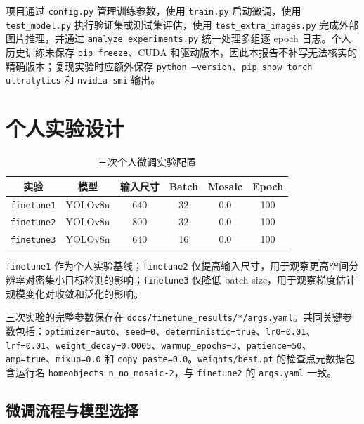 \documentclass[12pt,a4paper]{ctexart}
\begin{document}
项目通过 \texttt{config.py} 管理训练参数，使用 \texttt{train.py} 启动微调，使用 \texttt{test\_model.py} 执行验证集或测试集评估，使用 \texttt{test\_extra\_images.py} 完成外部图片推理，并通过 \texttt{analyze\_experiments.py} 统一处理多组逐 epoch 日志。个人历史训练未保存 \texttt{pip freeze}、CUDA 和驱动版本，因此本报告不补写无法核实的精确版本；复现实验时应额外保存 \texttt{python --version}、\texttt{pip show torch ultralytics} 和 \texttt{nvidia-smi} 输出。


\section{个人实验设计}

\begin{table}[H]
\centering
\caption{三次个人微调实验配置}
\begin{tabular}{cccccc}
\toprule
\textbf{实验} & \textbf{模型} & \textbf{输入尺寸} & \textbf{Batch} & \textbf{Mosaic} & \textbf{Epoch} \\
\midrule
\texttt{finetune1} & YOLOv8n & 640 & 32 & 0.0 & 100 \\
\texttt{finetune2} & YOLOv8n & 800 & 32 & 0.0 & 100 \\
\texttt{finetune3} & YOLOv8n & 640 & 16 & 0.0 & 100 \\
\bottomrule
\end{tabular}
\end{table}

\texttt{finetune1} 作为个人实验基线；\texttt{finetune2} 仅提高输入尺寸，用于观察更高空间分辨率对密集小目标检测的影响；\texttt{finetune3} 仅降低 batch size，用于观察梯度估计规模变化对收敛和泛化的影响。

三次实验的完整参数保存在 \texttt{docs/finetune\_results/*/args.yaml}。共同关键参数包括：\texttt{optimizer=auto}、\texttt{seed=0}、\texttt{deterministic=true}、\texttt{lr0=0.01}、\texttt{lrf=0.01}、\texttt{weight\_decay=0.0005}、\texttt{warmup\_epochs=3}、\texttt{patience=50}、\texttt{amp=true}、\texttt{mixup=0.0} 和 \texttt{copy\_paste=0.0}。\texttt{weights/best.pt} 的检查点元数据包含运行名 \texttt{homeobjects\_n\_no\_mosaic-2}，与 \texttt{finetune2} 的 \texttt{args.yaml} 一致。

\subsection{微调流程与模型选择}
\end{document}
